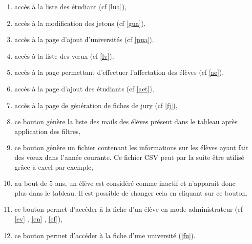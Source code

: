 \begin{enumerate}
\item accès à la liste des étudiant (cf \ref{lua}),
\item accès à la modification des jetons (cf \ref{gua}),
\item accès à la page d'ajout d'universités (cf \ref{pua}),
\item accès à la liste des vœux (cf \ref{lv}),
\item accès à la page permettant d'effectuer l'affectation des élèves (cf \ref{ae}),
\item accès à la page d'ajout des étudiants (cf \ref{aet}),
\item accès à la page de génération de fiches de jury (cf \ref{fj}),
\item ce bouton génère la liste des mails des élèves présent dans le tableau après application des filtres,
\item ce bouton génère un fichier contenant les informations sur les élèves ayant fait des vœux dans l'année courante. Ce fichier CSV peut par la suite être utilisé grâce à excel par exemple,
\item au bout de 5 ans, un élève est considéré comme inactif et n'apparait donc plus dans le tableau. Il est possible de changer cela en cliquant sur ce bouton,
\item ce bouton permet d'accéder à la fiche d'un élève en mode administrateur (cf \ref{ev} , \ref{en} , \ref{ef}),
\item ce bouton permet d'accéder à la fiche d'une université (\ref{fu}).
\end{enumerate}

 
